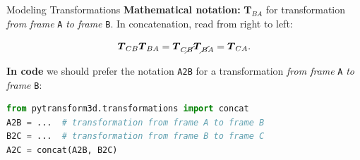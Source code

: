 \documentclass[14pt]{beamer}
\begin{document}
\begin{frame}{Modeling Transformations}
\textbf{Mathematical notation:}
$\boldsymbol{T}_{BA}$ for transformation \textit{from frame} \texttt{A} \textit{to frame}
\texttt{B}. In concatenation, read from right to left:

\[
\boldsymbol{T}_{CB} \boldsymbol{T}_{BA} = \boldsymbol{T}_{C\cancel{B}} \boldsymbol{T}_{\cancel{B}A} = \boldsymbol{T}_{CA}.
\]

\vfill

\textbf{In code} we should prefer the notation \texttt{A2B}
for a transformation \textit{from frame} \texttt{A} \textit{to frame} \texttt{B}:

\begin{lstlisting}[language=Python]
from pytransform3d.transformations import concat
A2B = ...  # transformation from frame A to frame B
B2C = ...  # transformation from frame B to frame C
A2C = concat(A2B, B2C)
\end{lstlisting}
\end{frame}
\end{document}
